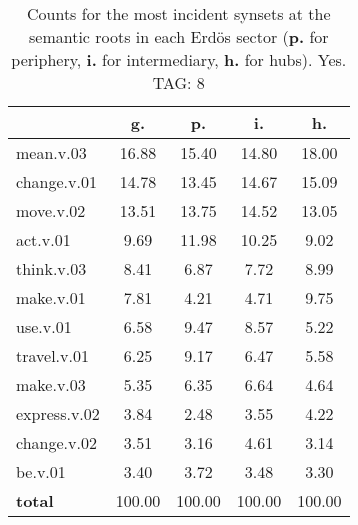 \begin{table}[h!]
\begin{center}
\begin{tabular}{| l || c | c | c | c |}\hline
 & {\bf g.} & {\bf p.} & {\bf i.} & {\bf h.} \\\hline\hline
mean.v.03 & 16.88  & 15.40  & 14.80  & 18.00 \\\hline
change.v.01 & 14.78  & 13.45  & 14.67  & 15.09 \\\hline
move.v.02 & 13.51  & 13.75  & 14.52  & 13.05 \\\hline
act.v.01 & 9.69  & 11.98  & 10.25  & 9.02 \\\hline
think.v.03 & 8.41  & 6.87  & 7.72  & 8.99 \\\hline
make.v.01 & 7.81  & 4.21  & 4.71  & 9.75 \\\hline
use.v.01 & 6.58  & 9.47  & 8.57  & 5.22 \\\hline
travel.v.01 & 6.25  & 9.17  & 6.47  & 5.58 \\\hline
make.v.03 & 5.35  & 6.35  & 6.64  & 4.64 \\\hline
express.v.02 & 3.84  & 2.48  & 3.55  & 4.22 \\\hline
change.v.02 & 3.51  & 3.16  & 4.61  & 3.14 \\\hline
be.v.01 & 3.40  & 3.72  & 3.48  & 3.30 \\\hline\hline
{{\bf total}} & 100.00  & 100.00  & 100.00  & 100.00 \\\hline
\end{tabular}
\caption{Counts for the most incident synsets at the semantic roots in each Erd\"os sector ({\bf p.} for periphery, {\bf i.} for intermediary, {\bf h.} for hubs). Yes. TAG: 8}
\end{center}
\end{table}